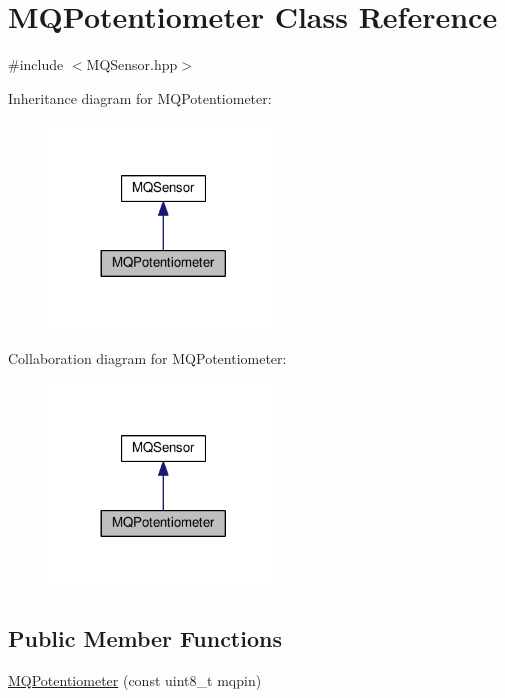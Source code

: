 \hypertarget{class_m_q_potentiometer}{}\section{M\+Q\+Potentiometer Class Reference}
\label{class_m_q_potentiometer}


{\ttfamily \#include $<$M\+Q\+Sensor.\+hpp$>$}



Inheritance diagram for M\+Q\+Potentiometer\+:\nopagebreak
\begin{figure}[H]
\begin{center}
\leavevmode
\includegraphics[width=173pt]{class_m_q_potentiometer__inherit__graph}
\end{center}
\end{figure}


Collaboration diagram for M\+Q\+Potentiometer\+:\nopagebreak
\begin{figure}[H]
\begin{center}
\leavevmode
\includegraphics[width=173pt]{class_m_q_potentiometer__coll__graph}
\end{center}
\end{figure}
\subsection*{Public Member Functions}
\begin{DoxyCompactItemize}
\item 
\hyperlink{class_m_q_potentiometer_a9a890ae1eee63b533f2865fcc82a5e66}{M\+Q\+Potentiometer} (const uint8\+\_\+t mqpin)
\end{DoxyCompactItemize}
